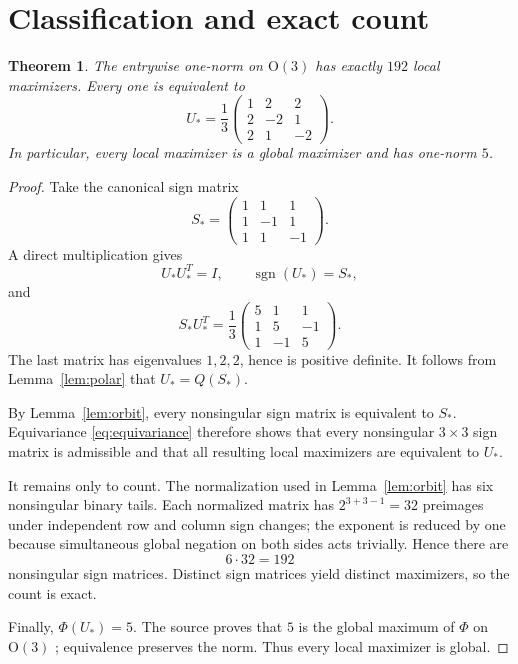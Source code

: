 \documentclass[11pt]{article}
\newtheorem{theorem}{Theorem}
\newcommand{\sgn}{\operatorname{sgn}}
\newcommand{\OO}{\mathrm O}
\begin{document}
\section{Classification and exact count}

\begin{theorem}\label{thm:main}
The entrywise one-norm on \(\OO(3)\) has exactly \(192\) local maximizers.
Every one is equivalent to
\[
 U_*=\frac13
 \begin{pmatrix}
 1&2&2\\
 2&-2&1\\
 2&1&-2
 \end{pmatrix}.
\]
In particular, every local maximizer is a global maximizer and has one-norm
\(5\).
\end{theorem}

\begin{proof}
Take the canonical sign matrix
\[
 S_*=\begin{pmatrix}1&1&1\\1&-1&1\\1&1&-1\end{pmatrix}.
\]
A direct multiplication gives
\[
 U_*U_*^T=I,\qquad \sgn(U_*)=S_*,
\]
and
\[
 S_*U_*^T
 =\frac13
 \begin{pmatrix}
 5&1&1\\
 1&5&-1\\
 1&-1&5
 \end{pmatrix}.
\]
The last matrix has eigenvalues \(1,2,2\), hence is positive definite.
It follows from Lemma~\ref{lem:polar} that \(U_*=Q(S_*)\).

By Lemma~\ref{lem:orbit}, every nonsingular sign matrix is equivalent to
\(S_*\). Equivariance \eqref{eq:equivariance} therefore shows that every
nonsingular \(3\times3\) sign matrix is admissible and that all resulting
local maximizers are equivalent to \(U_*\).

It remains only to count. The normalization used in Lemma~\ref{lem:orbit}
has six nonsingular binary tails. Each normalized matrix has
\(2^{3+3-1}=32\) preimages under independent row and column sign changes;
the exponent is reduced by one because simultaneous global negation on both
sides acts trivially. Hence there are
\[
 6\cdot32=192
\]
nonsingular sign matrices. Distinct sign matrices yield distinct
maximizers, so the count is exact.

Finally, \(\Phi(U_*)=5\). The source proves that \(5\) is the global maximum
of \(\Phi\) on \(\OO(3)\) \cite[Theorem 2.1]{BCS}; equivalence preserves the
norm. Thus every local maximizer is global.
\end{proof}
\end{document}
